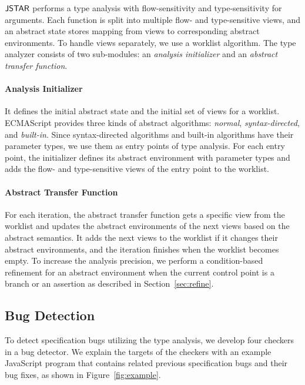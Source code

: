 $\tool$ performs a type analysis with flow-sensitivity and
type-sensitivity for arguments.
Each function is split into multiple flow- and type-sensitive views, and an
abstract state stores mapping from views to corresponding abstract environments.
To handle views separately, we use a worklist algorithm.
The type analyzer consists of two sub-modules: an \textit{analysis initializer} and an
\textit{abstract transfer function}.

\paragraph{Analysis Initializer} It defines the initial abstract state and the
initial set of views for a worklist. ECMAScript provides three
kinds of abstract algorithms: \textit{normal}, \textit{syntax-directed}, and
\textit{built-in}. Since syntax-directed algorithms and built-in algorithms have
their parameter types, we use them as entry points of type analysis.  For each entry point, the
initializer defines its abstract environment with parameter types and adds the
flow- and type-sensitive views of the entry point to the worklist.

\paragraph{Abstract Transfer Function} For each iteration, the abstract transfer function gets a
specific view from the worklist and updates the abstract environments of the next
views based on the abstract semantics.  It adds the next views to the worklist if
it changes their abstract environments, and the iteration finishes when
the worklist becomes empty.  To increase the analysis precision, we
perform a condition-based refinement for an abstract environment when the current
control point is a branch or an assertion as described in Section~\ref{sec:refine}.

\subsection{Bug Detection}\label{sec:overview-bug-detect}

To detect specification bugs utilizing the type analysis, we develop
four checkers in a bug detector.  We explain the targets of the checkers
with an example JavaScript program that contains related previous specification bugs and
their bug fixes, as shown in Figure~\ref{fig:example}.

